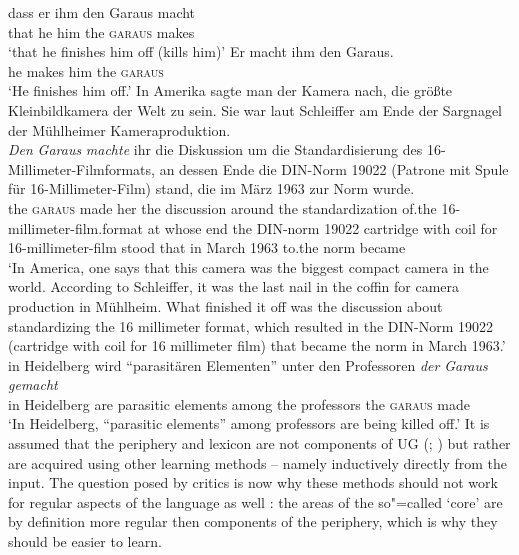 \largerpage
\eal
\ex 
\gll dass er ihm den Garaus macht\\
	 that he him the \textsc{garaus} makes\\
\glt `that he finishes him off (kills him)'
\ex 
\gll Er macht ihm den Garaus.\\
	 he makes him the \textsc{garaus}\\
\glt `He finishes him off.'
\ex
In Amerika sagte man der Kamera nach, die größte Kleinbildkamera der Welt zu sein. Sie war laut
Schleiffer am Ende der Sargnagel der Mühlheimer Kameraproduktion.\\
\gll 
\emph{Den} \emph{Garaus} \emph{machte} ihr die Diskussion um die Standardisierung des 16-Millimeter-Filmformats,
an dessen Ende die DIN-Norm 19022 (Patrone mit Spule für 16-Millimeter-Film) stand, die im März 1963
zur Norm wurde.\footnotemark\\
the \textsc{garaus} made her
the discussion around the standardization of.the 16-millimeter-film.format at whose end the DIN-norm 19022
\spacebr{}cartridge with coil for 16-millimeter-film stood that in March 1963 to.the norm
became\\
\glt `In America, one says that this camera was the biggest compact camera in the world. According to Schleiffer, it was the
last nail in the coffin for camera production in Mühlheim. What finished it off was the discussion about standardizing
the 16 millimeter format, which resulted in the DIN-Norm 19022 (cartridge with coil for 16 millimeter film) that became
the norm in March 1963.'
\ex
\gll in Heidelberg wird "`parasitären Elementen"' unter den Professoren \emph{der} \emph{Garaus} \emph{gemacht}\footnotemark\\
	 in Heidelberg are parasitic elements among the professors the \textsc{garaus} made\\
\glt `In Heidelberg, ``parasitic elements'' among professors are being killed off.'
\zl
\noindent
It is assumed that the periphery and lexicon are not components of UG (\citealp[--151]{Chomsky86a}; \citealp[]{Fodor98a})
but rather are acquired using other learning methods -- namely inductively directly from the
input. The question posed by critics is now why these methods should not work for regular aspects of
the language as well \parencites[]{Abney96a}[]{Goldberg2003b}[]{Goldberg2006a}[]{Newmeyer2005a}[]{Tomasello2006a}[]{Tomasello2006c}:
the areas of the so"=called `core' are by definition more regular then components of the periphery, which is why
they should be easier to learn.

